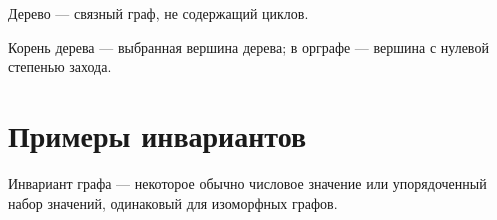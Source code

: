 \begin{my_def}
Дерево --- связный граф, не содержащий циклов.
\end{my_def}

\begin{my_def}
Корень дерева --- выбранная вершина дерева; в орграфе --- вершина с нулевой степенью захода.
\end{my_def}

\section{Примеры инвариантов}

\begin{my_def}
Инвариант графа --- некоторое обычно числовое значение или упорядоченный
набор значений, одинаковый для изоморфных графов.
\end{my_def}

